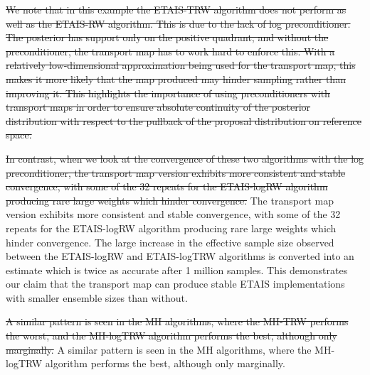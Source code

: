 \documentclass[final]{siamltex}
\newcommand{\edit}[1]{{\color{red} #1}}  %
\providecommand{\DIFdel}[1]{{\protect\color{red}\sout{#1}}}                      %
\providecommand{\DIFaddbegin}{} %
\providecommand{\DIFaddend}{} %
\providecommand{\DIFdelbegin}{} %
\providecommand{\DIFdelend}{} %
\newcommand{\DIFscaledelfig}{0.5}
\newlength{\DIFdelgraphicswidth} %
\newlength{\DIFdelgraphicsheight} %
\newcommand{\DIFaddincludegraphics}[2][]{{\color{blue}\fbox{\DIFOincludegraphics[#1]{#2}}}} %
\newcommand{\DIFdelincludegraphics}[2][]{%
\sbox{\DIFdelgraphicsbox}{\DIFOincludegraphics[#1]{#2}}%
\settoboxwidth{\DIFdelgraphicswidth}{\DIFdelgraphicsbox} %
\settoboxtotalheight{\DIFdelgraphicsheight}{\DIFdelgraphicsbox} %
\scalebox{\DIFscaledelfig}{%
\parbox[b]{\DIFdelgraphicswidth}{\usebox{\DIFdelgraphicsbox}\\[-\baselineskip] \rule{\DIFdelgraphicswidth}{0em}}\llap{\resizebox{\DIFdelgraphicswidth}{\DIFdelgraphicsheight}{%
\setlength{\unitlength}{\DIFdelgraphicswidth}%
\begin{picture}(1,1)%
\thicklines\linethickness{2pt} %
{\color[rgb]{1,0,0}\put(0,0){\framebox(1,1){}}}%
{\color[rgb]{1,0,0}\put(0,0){\line( 1,1){1}}}%
{\color[rgb]{1,0,0}\put(0,1){\line(1,-1){1}}}%
\end{picture}%
}\hspace*{3pt}}} %
} %
\DeclareRobustCommand{\DIFaddbegin}{\DIFOaddbegin \let\includegraphics\DIFaddincludegraphics} %
\DeclareRobustCommand{\DIFaddend}{\DIFOaddend \let\includegraphics\DIFOincludegraphics} %
\DeclareRobustCommand{\DIFdelbegin}{\DIFOdelbegin \let\includegraphics\DIFdelincludegraphics} %
\DeclareRobustCommand{\DIFdelend}{\DIFOaddend \let\includegraphics\DIFOincludegraphics} %
\begin{document}
\DIFdelbegin \DIFdel{We note that in this 
example the ETAIS-TRW algorithm does not perform as well as the ETAIS-RW
algorithm. This is due to the lack of log preconditioner. The
posterior has support only on the positive quadrant, and without the
preconditioner, the transport map has to work hard to enforce
this. With a relatively low-dimensional approximation being used for
the transport map, this makes it more likely that the map produced
may hinder sampling rather than improving it. This highlights the
importance of using preconditioners with transport maps in order to
ensure absolute continuity of the posterior distribution with respect
to the pullback of the proposal distribution on reference space.
}\DIFdelend %

\DIFdelbegin \DIFdel{In contrast, when we look at the convergence of these two algorithms
with the log preconditioner, the transport map version exhibits more
consistent and stable convergence, with some of the 32 repeats for the
ETAIS-logRW algorithm producing rare large weights which hinder convergence.
}\DIFdelend \DIFaddbegin \edit{The transport map version exhibits more
consistent and stable convergence, with some of the 32 repeats for the
ETAIS-logRW algorithm producing rare large weights which hinder convergence.}
\DIFaddend The large increase in the effective sample size
observed between the ETAIS-logRW and ETAIS-logTRW algorithms is
converted into an estimate which is twice as accurate after 1 million
samples. This demonstrates our claim that the transport map can
produce stable ETAIS implementations with smaller ensemble sizes than without.

\DIFdelbegin \DIFdel{A similar pattern is seen in the MH algorithms, where the MH-TRW
performs the worst, and the MH-logTRW algorithm performs the best,
although only marginally. 
}\DIFdelend \DIFaddbegin \edit{A similar pattern is seen in the MH algorithms, where the MH-logTRW algorithm performs the best,
although only marginally. }
\DIFaddend 
\end{document}
